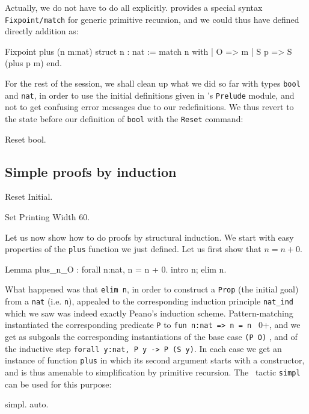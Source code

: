 \documentclass[11pt,a4paper]{book}
\begin{document}
Actually, we do not have to do all explicitly. {\Coq} provides a
special syntax {\tt Fixpoint/match} for generic primitive recursion,
and we could thus have defined directly addition as:

\begin{coq_example}
Fixpoint plus (n m:nat) {struct n} : nat :=
  match n with
  | O => m
  | S p => S (plus p m)
  end.
\end{coq_example}

For the rest of the session, we shall clean up what we did so far with 
types \verb:bool: and \verb:nat:, in order to use the initial definitions
given in \Coq's \verb:Prelude: module, and not to get confusing error
messages due to our redefinitions. We thus revert to the state before
our definition of \verb:bool: with the \verb:Reset: command:
\begin{coq_example}
Reset bool.
\end{coq_example}


\subsection{Simple proofs by induction}

\begin{coq_eval}
Reset Initial.
\end{coq_eval}
\begin{coq_eval}
Set Printing Width 60.
\end{coq_eval}

Let us now show how to do proofs by structural induction. We start with easy
properties of the \verb:plus: function we just defined. Let us first
show that $n=n+0$.
\begin{coq_example}
Lemma plus_n_O : forall n:nat, n = n + 0.
intro n; elim n.
\end{coq_example}

What happened was that \verb:elim n:, in order to construct a \verb:Prop:
(the initial goal) from a \verb:nat: (i.e. \verb:n:), appealed to the
corresponding induction principle \verb:nat_ind: which we saw was indeed
exactly Peano's induction scheme. Pattern-matching instantiated the 
corresponding predicate \verb:P: to \verb+fun n:nat => n = n + 0+, and we get
as subgoals the corresponding instantiations of the base case \verb:(P O): ,
and of the inductive step \verb+forall y:nat, P y -> P (S y)+.
In each case we get an instance of function \verb:plus: in which its second
argument starts with a constructor, and is thus amenable to simplification
by primitive recursion. The \Coq~tactic \verb:simpl: can be used for
this purpose:
\begin{coq_example}
simpl.
auto.
\end{coq_example}
\end{document}
